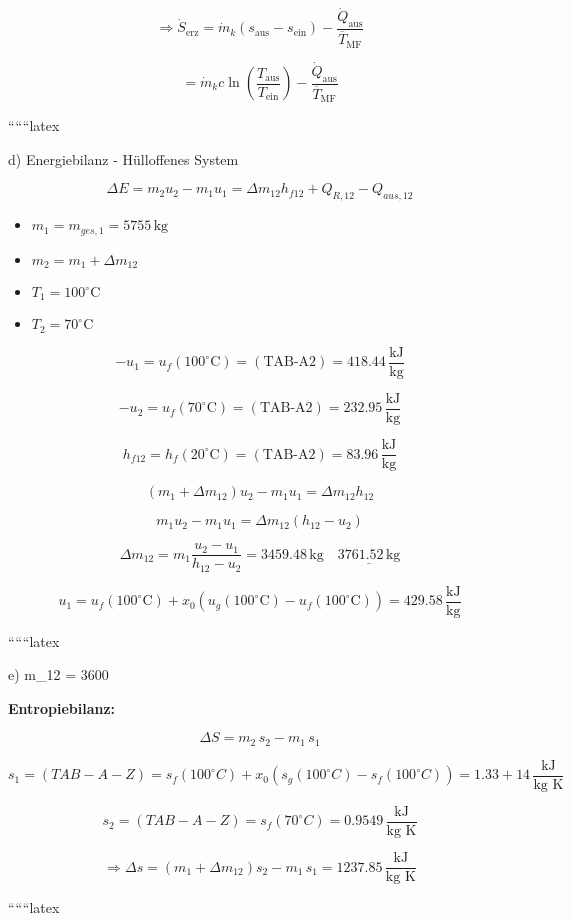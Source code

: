 \[
\Rightarrow \dot{S}_{\text{erz}} = \dot{m}_k \left( s_{\text{aus}} - s_{\text{ein}} \right) - \frac{\dot{Q}_{\text{aus}}}{\overline{T}_{\text{MF}}}
\]

\[
= \dot{m}_k c \ln \left( \frac{T_{\text{aus}}}{T_{\text{ein}}} \right) - \frac{\dot{Q}_{\text{aus}}}{\overline{T}_{\text{MF}}}
\]

``````latex


d) Energiebilanz - Hülloffenes System

\[
\Delta E = m_2 u_2 - m_1 u_1 = \Delta m_{12} h_{f12} + Q_{R,12} - Q_{aus,12}
\]

\begin{itemize}
    \item $m_1 = m_{ges,1} = 5755 \, \text{kg}$
    \item $m_2 = m_1 + \Delta m_{12}$
    \item $T_1 = 100^\circ \text{C}$
    \item $T_2 = 70^\circ \text{C}$
\end{itemize}

\[
-u_1 = u_f (100^\circ \text{C}) = (\text{TAB-A2}) = 418.44 \, \frac{\text{kJ}}{\text{kg}}
\]

\[
-u_2 = u_f (70^\circ \text{C}) = (\text{TAB-A2}) = 232.95 \, \frac{\text{kJ}}{\text{kg}}
\]

\[
h_{f12} = h_f (20^\circ \text{C}) = (\text{TAB-A2}) = 83.96 \, \frac{\text{kJ}}{\text{kg}}
\]

\[
(m_1 + \Delta m_{12}) u_2 - m_1 u_1 = \Delta m_{12} h_{12}
\]

\[
m_1 u_2 - m_1 u_1 = \Delta m_{12} (h_{12} - u_2)
\]

\[
\Delta m_{12} = m_1 \frac{u_2 - u_1}{h_{12} - u_2} = 3459.48 \, \text{kg} \quad \underline{3761.52 \, \text{kg}}
\]

\[
u_1 = u_f (100^\circ \text{C}) + x_0 (u_g (100^\circ \text{C}) - u_f (100^\circ \text{C})) = 429.58 \, \frac{\text{kJ}}{\text{kg}}
\]

``````latex


e) \quad \Delta m_{12} = 3600 \, 

\textbf{Entropiebilanz:}

\[
\Delta S = m_2 \, s_2 - m_1 \, s_1
\]

\[
s_1 = (TAB - A - Z) = s_f(100^\circ C) + x_0 \left( s_g(100^\circ C) - s_f(100^\circ C) \right) = 1.33 + 14 \, \frac{\text{kJ}}{\text{kg K}}
\]

\[
s_2 = (TAB - A - Z) = s_f(70^\circ C) = 0.9549 \, \frac{\text{kJ}}{\text{kg K}}
\]

\[
\Rightarrow \Delta s = \left( m_1 + \Delta m_{12} \right) s_2 - m_1 \, s_1 = 1237.85 \, \frac{\text{kJ}}{\text{kg K}}
\]

``````latex


